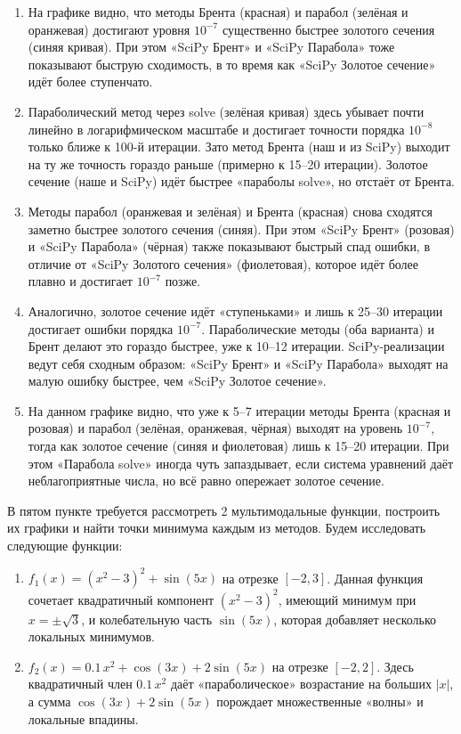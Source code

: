 \documentclass[a4paper,12pt]{article}
\begin{document}
\begin{enumerate}
    \item На графике видно, что методы Брента (красная) и парабол (зелёная и оранжевая) достигают уровня $10^{-7}$ существенно быстрее золотого сечения (синяя кривая). При этом «SciPy Брент» и «SciPy Парабола» тоже показывают быструю сходимость, в то время как «SciPy Золотое сечение» идёт более ступенчато.
    \item Параболический метод через solve (зелёная кривая) здесь убывает почти линейно в логарифмическом масштабе и достигает точности порядка $10^{-8}$ только ближе к 100-й итерации. Зато метод Брента (наш и из SciPy) выходит на ту же точность гораздо раньше (примерно к 15--20 итерации). Золотое сечение (наше и SciPy) идёт быстрее «параболы solve», но отстаёт от Брента.
    \item Методы парабол (оранжевая и зелёная) и Брента (красная) снова сходятся заметно быстрее золотого сечения (синяя). При этом «SciPy Брент» (розовая) и «SciPy Парабола» (чёрная) также показывают быстрый спад ошибки, в отличие от «SciPy Золотого сечения» (фиолетовая), которое идёт более плавно и достигает $10^{-7}$ позже.
    \item Аналогично, золотое сечение идёт «ступеньками» и лишь к 25--30 итерации достигает ошибки порядка $10^{-7}$. Параболические методы (оба варианта) и Брент делают это гораздо быстрее, уже к 10--12 итерации. SciPy-реализации ведут себя сходным образом: «SciPy Брент» и «SciPy Парабола» выходят на малую ошибку быстрее, чем «SciPy Золотое сечение».
    \item На данном графике видно, что уже к 5--7 итерации методы Брента (красная и розовая) и парабол (зелёная, оранжевая, чёрная) выходят на уровень $10^{-7}$, тогда как золотое сечение (синяя и фиолетовая) лишь к 15--20 итерации. При этом «Парабола solve» иногда чуть запаздывает, если система уравнений даёт неблагоприятные числа, но всё равно опережает золотое сечение.
\end{enumerate}

В пятом пункте требуется рассмотреть 2 мультимодальные функции, построить их графики и найти точки минимума каждым из методов. Будем исследовать следующие функции:
\begin{enumerate}
    \item $f_1(x) = (x^2 - 3)^2 + \sin(5x)$ на отрезке $[-2, 3]$. Данная функция сочетает квадратичный компонент $(x^2 - 3)^2$, имеющий минимум при $x = \pm\sqrt{3}$, и колебательную часть $\sin(5x)$, которая добавляет несколько локальных минимумов.
    \item $f_2(x) = 0.1\,x^2 + \cos(3x) + 2\sin(5x)$ на отрезке $[-2, 2]$. Здесь квадратичный член $0.1\,x^2$ даёт «параболическое» возрастание на больших $|x|$, а сумма $\cos(3x) + 2\sin(5x)$ порождает множественные «волны» и локальные впадины.
\end{enumerate}
\end{document}
